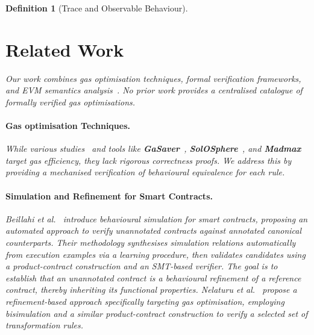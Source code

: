 \documentclass[manuscript,screen,review]{acmart}
\newtheorem{definition}{Definition}
\begin{document}
\begin{definition}[Trace and Observable Behaviour]
\section{Related Work}
\label{sec:related_work}

Our work combines gas optimisation techniques, formal verification frameworks, and EVM semantics analysis~\cite{GASOL,albert2018ethir,amani2018towards,certora2023}. No prior work provides a centralised catalogue of formally verified gas optimisations.

\paragraph{Gas optimisation Techniques.} While various studies~\cite{chen2017under,khanzadeh2023optimizing,NBL21,Nelaturu2021} and tools like \textbf{GaSaver}~\cite{ZLS23}, \textbf{SolOSphere}~\cite{KA24}, and \textbf{Madmax}~\cite{grech2018madmax} target gas efficiency, they lack rigorous correctness proofs. We address this by providing a mechanised verification of behavioural equivalence for each rule.

\paragraph{Simulation and Refinement for Smart Contracts.}
Beillahi {\em et al.\/}~\cite{Beillahi2020} introduce behavioural simulation for smart contracts, proposing an automated approach to verify unannotated contracts against annotated canonical counterparts. Their methodology synthesises simulation relations automatically from execution examples via a learning procedure, then validates candidates using a product-contract construction and an SMT-based verifier. The goal is to establish that an unannotated contract is a behavioural refinement of a reference contract, thereby inheriting its functional properties. Nelaturu {\em et al.\/}~\cite{NBL21} propose a refinement-based approach specifically targeting gas optimisation, employing bisimulation and a similar product-contract construction to verify a selected set of transformation rules.


\end{definition}
\end{document}
